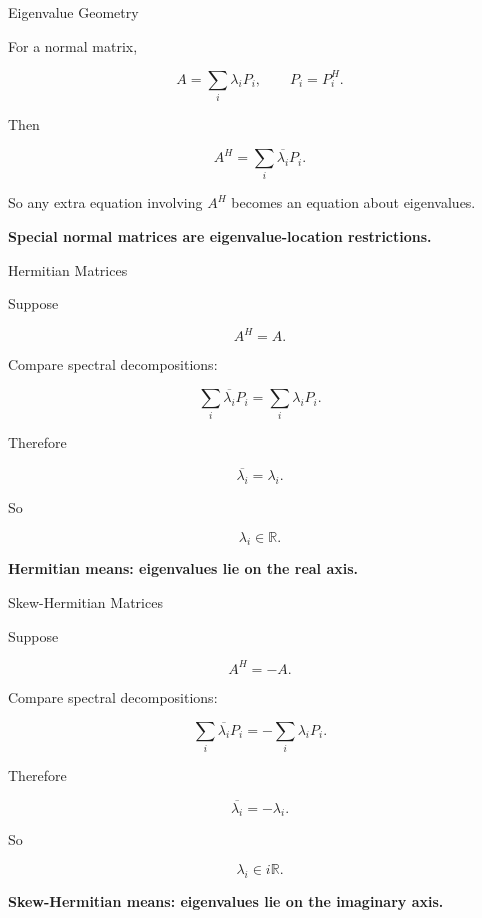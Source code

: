 \documentclass[10pt]{beamer}
\theoremstyle{definition}
\newcommand{\x}[1]{\alert{\textbf{#1}}}
\begin{document}
\begin{frame}{Eigenvalue Geometry}

For a normal matrix,

$$
A=\sum_i\lambda_iP_i,
\qquad
P_i=P_i^H.
$$

\vfill

Then

$$
A^H=\sum_i\overline{\lambda_i}P_i.
$$

\vfill

So any extra equation involving $A^H$ becomes an equation about eigenvalues.

\vfill

\begin{center}
\x{Special normal matrices are eigenvalue-location restrictions.}
\end{center}

\end{frame}

\begin{frame}[shrink=8]{Hermitian Matrices}

Suppose

$$
A^H=A.
$$

\vfill

Compare spectral decompositions:

$$
\sum_i\overline{\lambda_i}P_i
=
\sum_i\lambda_iP_i.
$$

\vfill

Therefore

$$
\overline{\lambda_i}=\lambda_i.
$$

\vfill

So

$$
\boxed{\lambda_i\in\mathbb R.}
$$

\vfill

\begin{center}
\x{Hermitian means: eigenvalues lie on the real axis.}
\end{center}

\end{frame}

\begin{frame}[shrink=8]{Skew-Hermitian Matrices}

Suppose

$$
A^H=-A.
$$

\vfill

Compare spectral decompositions:

$$
\sum_i\overline{\lambda_i}P_i
=
-
\sum_i\lambda_iP_i.
$$

\vfill

Therefore

$$
\overline{\lambda_i}=-\lambda_i.
$$

\vfill

So

$$
\boxed{\lambda_i\in i\mathbb R.}
$$

\vfill

\begin{center}
\x{Skew-Hermitian means: eigenvalues lie on the imaginary axis.}
\end{center}

\end{frame}
\end{document}
